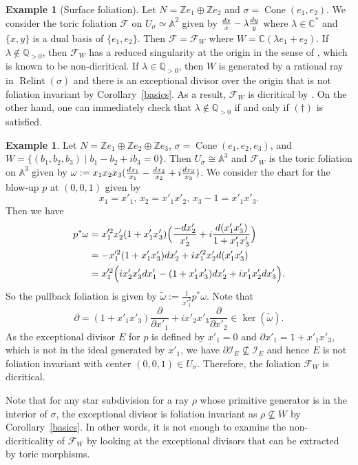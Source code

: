 \documentclass[12pt,reqno]{amsart}
\theoremstyle{definition}
\newtheorem{example}[theorem]{Example}
\newcommand{\on}{\operatorname}
\newcommand\cF{{\mathcal{F}}}
\newcommand\cI{{\mathcal{I}}}
\newcommand\bA{{\mathbb A}}
\newcommand\bC{{\mathbb C}}
\newcommand\bQ{{\mathbb Q}}
\newcommand\bZ{{\mathbb Z}}
\newcommand{\diff}{\textnormal{d}}
\begin{document}
\begin{example}[Surface foliation]\label{eg_dicritical_1}
Let $N=\bZ e_1\oplus \bZ e_2$ and $\sigma=\on{Cone}(e_1, e_2)$. 
We consider the toric foliation $\cF$ on $U_\sigma\simeq\bA^2$ given by $\frac{\diff x}{x}-\lambda\frac{\diff y}{y}$ where $\lambda\in\bC^*$ and $\{x,y\}$ is a dual basis of $\{e_1,e_2\}$. 
Then $\cF=\cF_W$ where $W=\bC(\lambda e_1+e_2)$. 
If $\lambda\notin \bQ_{>0}$, then $\cF_W$ has a reduced singularity at the origin in the sense of \cite[Definition 1.1]{brunella2015birational}, which is known to be non-dicritical. 
If $\lambda\in \bQ_{>0}$, then $W$ is generated by a rational ray in $\on{Relint}(\sigma)$ and there is an exceptional divisor over the origin that is not foliation invariant by Corollary~\ref{basics}. 
As a result, $\cF_W$ is dicritical by \cite[Proposition 1.11]{brunella2015birational}. 
On the other hand, one can immediately check that $\lambda\notin \bQ_{>0}$ if and only if $(\dagger)$ is satisfied.
\end{example}

\begin{example}\label{eg_dicritical_2}
    Let $N=\bZ e_1\oplus \bZ e_2\oplus \bZ e_3$, $\sigma=\on{Cone}(e_1, e_2,e_3)$, and $W=\{(b_1,b_2,b_3)\mid b_1-b_2+ib_3=0\}$. 
Then $U_\sigma\cong\bA^3$ and $\cF_W$ is the toric foliation on $\bA^3$ given by $\omega := x_1x_2x_3(\frac{\diff x_1}{x_1}-\frac{\diff x_2}{x_2}+i\frac{\diff x_3}{x_3})$. 
We consider the chart for the blow-up $p$ at $(0,0,1)$ given by 
\[x_1=x'_1,\, x_2=x'_1x'_2,\, x_3-1=x'_1x'_3.\]
Then we have 
\begin{align*}
    p^*\omega &= x'^2_1x'_2(1+x'_1x'_3)\Big(\frac{-\diff x'_2}{x'_2}+i\frac{\diff(x'_1x'_3)}{1+x'_1x'_3}\Big) \\
    &= -x'^2_1(1+x'_1x'_3)\diff x'_2 + ix'^2_1x'_2\diff(x'_1x'_3) \\
    &= x'^2_1\Big(ix'_2x'_3\diff x'_1 - (1+x'_1x'_3)\diff x'_2 + ix'_1x'_2\diff x'_3\Big).
\end{align*}
So the pullback foliation is given by $\widetilde{\omega}:=\frac{1}{x'^2_1}p^*\omega$. 
Note that 
\[\partial = (1+x'_1x'_3)\frac{\partial}{\partial x'_1}+ix'_2x'_3\frac{\partial}{\partial x'_2}\in\ker(\widetilde{\omega}).\] 
As the exceptional divisor $E$ for $p$ is defined by $x'_1=0$ and $\partial x'_1 = 1+x'_1x'_3$, which is not in the ideal generated by $x'_1$,  we have $\partial \cI_E \nsubseteq \cI_E$ and hence $E$ is not foliation invariant with center $(0,0,1)\in U_\sigma$. 
Therefore, the foliation $\cF_W$ is dicritical. 

Note that for any star subdivision for a ray $\rho$ whose primitive generator is in the interior of $\sigma$, the exceptional divisor is foliation invariant as $\rho\nsubseteq W$ by Corollary~\ref{basics}. In other words, it is not enough to examine the non-dicriticality of $\cF_W$ by looking at the exceptional divisors that can be extracted by toric morphisms.
\end{example}
\end{document}
